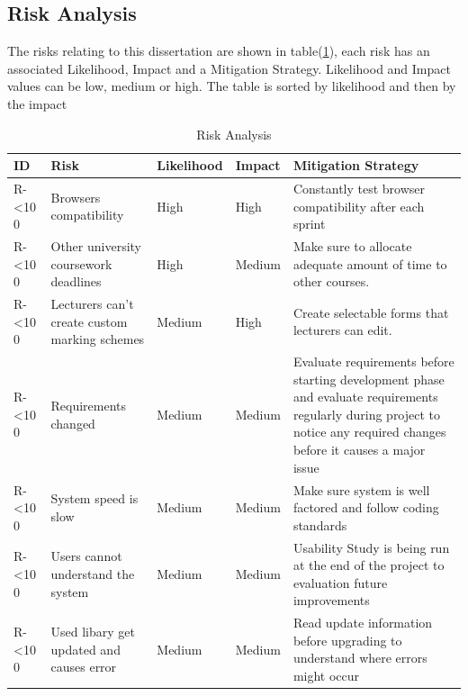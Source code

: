 \documentclass[12pt]{article}  %
\newcommand{\rid}[1]{\centering #1-\ifnum\value{requirement}<10 0\fi\arabic{requirement} \stepcounter{requirement}}
\begin{document}
\subsection{Risk Analysis}

The risks relating to this dissertation are shown in table(\ref{table:risks}), each risk has an associated Likelihood, Impact and a Mitigation Strategy. Likelihood and Impact values can be low, medium or high. The table is sorted by likelihood and then by the impact

\begin{spacing}{1.2}
\begin{longtable}{|p{}|p{}|p{}|p{}|p{}|}
\caption{Risk Analysis} \label{table:risks} \\
\hline

\textbf{ID} & \textbf{Risk} & \textbf{Likelihood} & \textbf{Impact } & \textbf{Mitigation Strategy}\\
\hline

\rid{R} & Browsers compatibility & High & High & Constantly test browser compatibility after each sprint\\ \hline

\rid{R} & Other university coursework deadlines & High & Medium & Make sure to allocate adequate amount of time to other courses.\\ \hline



\rid{R} & Lecturers can’t create custom marking schemes & Medium & High & Create selectable forms that lecturers can edit.\\ \hline

\rid{R} & Requirements changed & Medium & Medium & Evaluate requirements before starting development phase and evaluate requirements regularly during project to notice any required changes before it causes a major issue \\ \hline

\rid{R} & System speed is slow & Medium & Medium & Make sure system is well factored and follow coding standards \\ \hline

\rid{R} & Users cannot understand the system & Medium & Medium & Usability Study is being run at the end of the project to evaluation future improvements\\ \hline

\rid{R} & Used libary get updated and causes error & Medium & Medium & Read update information before upgrading to understand where errors might occur\\ \hline


\end{longtable}
\end{spacing}
\end{document}
